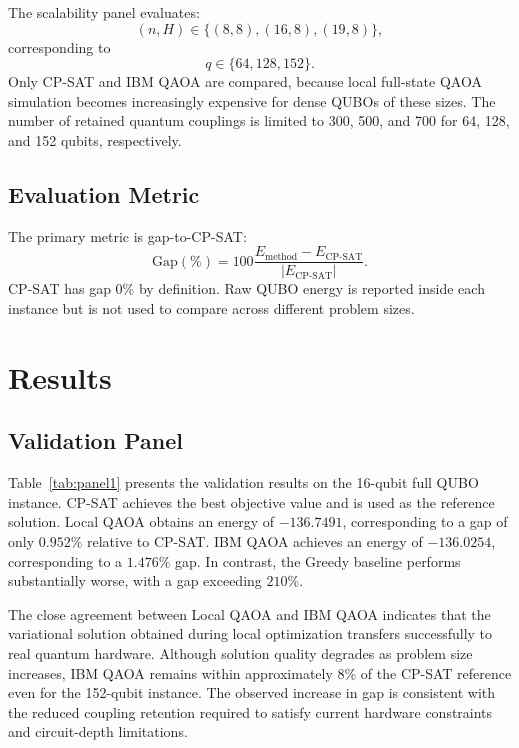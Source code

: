 \documentclass[runningheads]{llncs}
\begin{document}
The scalability panel evaluates:
\begin{equation}
(n,H)\in\{(8,8),(16,8),(19,8)\},
\end{equation}
corresponding to
\begin{equation}
q\in\{64,128,152\}.
\end{equation}
Only CP-SAT and IBM QAOA are compared, because local full-state QAOA simulation becomes increasingly expensive for dense QUBOs of these sizes. The number of retained quantum couplings is limited to 300, 500, and 700 for 64, 128, and 152 qubits, respectively.

\subsection{Evaluation Metric}

The primary metric is gap-to-CP-SAT:
\begin{equation}
\mathrm{Gap}(\%)=
100
\frac{E_{\mathrm{method}}-E_{\mathrm{CP\text{-}SAT}}}
{|E_{\mathrm{CP\text{-}SAT}}|}.
\label{eq:gap}
\end{equation}
CP-SAT has gap $0\%$ by definition. Raw QUBO energy is reported inside each instance but is not used to compare across different problem sizes.

\section{Results}

\subsection{Validation Panel}

Table~\ref{tab:panel1} presents the validation results on the 16-qubit full QUBO instance. CP-SAT achieves the best objective value and is used as the reference solution. Local QAOA obtains an energy of $-136.7491$, corresponding to a gap of only $0.952\%$ relative to CP-SAT. IBM QAOA achieves an energy of $-136.0254$, corresponding to a $1.476\%$ gap. In contrast, the Greedy baseline performs substantially worse, with a gap exceeding $210\%$.

The close agreement between Local QAOA and IBM QAOA indicates that the variational solution obtained during local optimization transfers successfully to real quantum hardware. Although solution quality degrades as problem size increases, IBM QAOA remains within approximately $8\%$ of the CP-SAT reference even for the 152-qubit instance. The observed increase in gap is consistent with the reduced coupling retention required to satisfy current hardware constraints and circuit-depth limitations.
\end{document}
